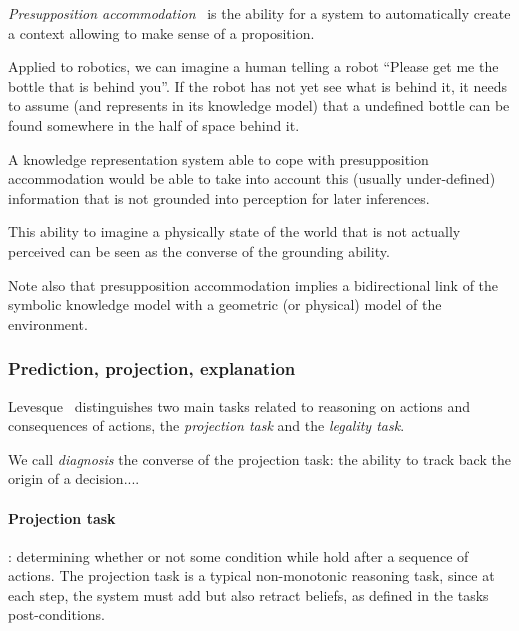\emph{Presupposition accommodation}~\cite{VonFintel2008} is the ability for a
system to automatically create a context allowing to make sense of a
proposition.

Applied to robotics, we can imagine a human telling a robot ``Please get me the
bottle that is behind you''. If the robot has not yet see what is behind it, it
needs to assume (and represents in its knowledge model) that a undefined bottle
can be found somewhere in the half of space behind it.

A knowledge representation system able to cope with presupposition
accommodation would be able to take into account this (usually under-defined)
information that is not grounded into perception for later inferences.

This ability to imagine a physically state of the world that is not actually
perceived can be seen as the converse of the grounding ability.

Note also that presupposition accommodation implies a bidirectional link of the
symbolic knowledge model with a geometric (or physical) model of the
environment.

\subsubsection{Prediction, projection, explanation}
\label{sect|prediction-projection}

Levesque~\cite{Levesque2008} distinguishes two main tasks related to reasoning
on actions and consequences of actions, the \emph{projection task} and the
\emph{legality task}.

We call \emph{diagnosis} the converse of the projection task: the ability to
track back the origin of a decision....

\begin{scriptsize}
\begin{center}
\end{center}
\end{scriptsize}


\paragraph{Projection task}: determining whether or not some condition while
hold after a sequence of actions. The projection task is a typical
non-monotonic reasoning task, since at each step, the system must add but also
retract beliefs, as defined in the tasks post-conditions.

